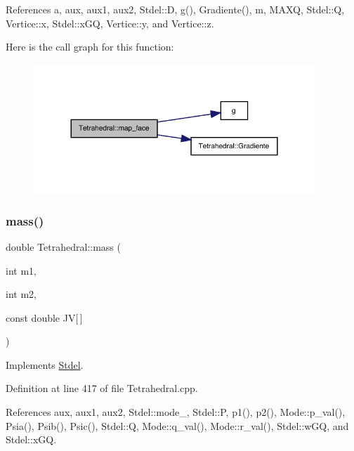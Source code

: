 References a, aux, aux1, aux2, Stdel\+::D, g(), Gradiente(), m, M\+A\+XQ, Stdel\+::Q, Vertice\+::x, Stdel\+::x\+GQ, Vertice\+::y, and Vertice\+::z.

Here is the call graph for this function\+:
\nopagebreak
\begin{figure}[H]
\begin{center}
\leavevmode
\includegraphics[width=300pt]{classTetrahedral_a3db10cbcaa2306d1be9656c04c9e9366_cgraph}
\end{center}
\end{figure}
\mbox{\label{classTetrahedral_a0ac27c7dabcc007ef5a2acaa3cfe789d}} 
\subsubsection{\texorpdfstring{mass()}{mass()}}
{\footnotesize\ttfamily double Tetrahedral\+::mass (\begin{DoxyParamCaption}\item[{int}]{m1,  }\item[{int}]{m2,  }\item[{const double}]{JV\mbox{[}$\,$\mbox{]} }\end{DoxyParamCaption})\hspace{0.3cm}{\ttfamily [virtual]}}



Implements \hyperlink{classStdel_ab475cc8bc82a3b8a5200d4d841ef0a51}{Stdel}.



Definition at line 417 of file Tetrahedral.\+cpp.



References aux, aux1, aux2, Stdel\+::mode\+\_\+, Stdel\+::P, p1(), p2(), Mode\+::p\+\_\+val(), Psia(), Psib(), Psic(), Stdel\+::Q, Mode\+::q\+\_\+val(), Mode\+::r\+\_\+val(), Stdel\+::w\+GQ, and Stdel\+::x\+GQ.

